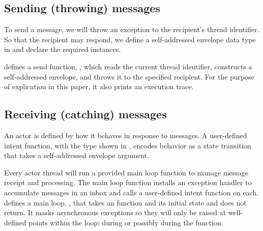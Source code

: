 \documentclass[sigplan,screen]{acmart}
\begin{document}
\subsection{Sending (throwing) messages}
\label{sec:sending-throwing}


To send a message, we will throw an exception to the recipient's thread
identifier.
%
So that the recipient may respond, we define a self-addressed envelope data
type in  and declare the required instances.


 defines a send function, ,
which reads the current thread identifier, constructs a self-addressed
envelope, and throws it to the specified recipient.
%
For the purpose of explication in this paper, it also prints an execution trace.


\subsection{Receiving (catching) messages}
\label{sec:receiving-catching}


An actor is defined by how it behaves in response to messages.
%
A user-defined intent function, with the type  shown in
,
encodes behavior as a state transition that takes a self-addressed envelope
argument.


Every actor thread will run a provided main loop function to manage message
receipt and processing.
%
The main loop function installs an exception handler to accumulate messages in
an inbox and calls a user-defined intent function on each.
%
 defines a main loop, , that
takes an  function and its initial state and does not return.
%
It masks asynchronous exceptions so they will only be raised at well-defined
points within the loop: during  or possibly during the
 function.
\end{document}

